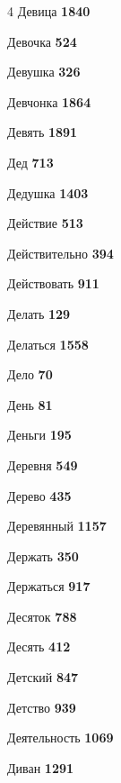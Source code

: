 \begin{multicols}{4}
\noindent Девица \dotfill \textbf{\color{secondary} 1840}\par
\noindent Девочка \dotfill \textbf{\color{secondary} 524}\par
\noindent Девушка \dotfill \textbf{\color{secondary} 326}\par
\noindent Девчонка \dotfill \textbf{\color{secondary} 1864}\par
\noindent Девять \dotfill \textbf{\color{secondary} 1891}\par
\noindent Дед \dotfill \textbf{\color{secondary} 713}\par
\noindent Дедушка \dotfill \textbf{\color{secondary} 1403}\par
\noindent Действие \dotfill \textbf{\color{secondary} 513}\par
\noindent Действительно \dotfill \textbf{\color{secondary} 394}\par
\noindent Действовать \dotfill \textbf{\color{secondary} 911}\par
\noindent Делать \dotfill \textbf{\color{secondary} 129}\par
\noindent Делаться \dotfill \textbf{\color{secondary} 1558}\par
\noindent Дело \dotfill \textbf{\color{secondary} 70}\par
\noindent День \dotfill \textbf{\color{secondary} 81}\par
\noindent Деньги \dotfill \textbf{\color{secondary} 195}\par
\noindent Деревня \dotfill \textbf{\color{secondary} 549}\par
\noindent Дерево \dotfill \textbf{\color{secondary} 435}\par
\noindent Деревянный \dotfill \textbf{\color{secondary} 1157}\par
\noindent Держать \dotfill \textbf{\color{secondary} 350}\par
\noindent Держаться \dotfill \textbf{\color{secondary} 917}\par
\noindent Десяток \dotfill \textbf{\color{secondary} 788}\par
\noindent Десять \dotfill \textbf{\color{secondary} 412}\par
\noindent Детский \dotfill \textbf{\color{secondary} 847}\par
\noindent Детство \dotfill \textbf{\color{secondary} 939}\par
\noindent Деятельность \dotfill \textbf{\color{secondary} 1069}\par
\noindent Диван \dotfill \textbf{\color{secondary} 1291}\par

\end{multicols}
